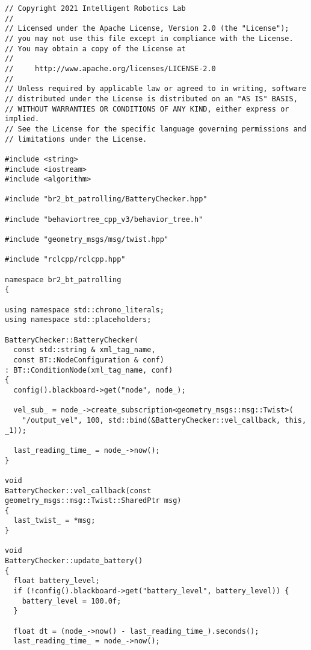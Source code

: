  \footnotesize
\begin{tcolorbox}[sharp corners, colframe=gray!80, colback=LightGray, left=0pt, top=0pt, bottom=0pt, title=\texttt{br2\_bt\_patrolling/src/br2\_bt\_patrolling/BatteryChecker.cpp}]
  \begin{verbatim}
// Copyright 2021 Intelligent Robotics Lab
//
// Licensed under the Apache License, Version 2.0 (the "License");
// you may not use this file except in compliance with the License.
// You may obtain a copy of the License at
//
//     http://www.apache.org/licenses/LICENSE-2.0
//
// Unless required by applicable law or agreed to in writing, software
// distributed under the License is distributed on an "AS IS" BASIS,
// WITHOUT WARRANTIES OR CONDITIONS OF ANY KIND, either express or implied.
// See the License for the specific language governing permissions and
// limitations under the License.

#include <string>
#include <iostream>
#include <algorithm>

#include "br2_bt_patrolling/BatteryChecker.hpp"

#include "behaviortree_cpp_v3/behavior_tree.h"

#include "geometry_msgs/msg/twist.hpp"

#include "rclcpp/rclcpp.hpp"

namespace br2_bt_patrolling
{

using namespace std::chrono_literals;
using namespace std::placeholders;

BatteryChecker::BatteryChecker(
  const std::string & xml_tag_name,
  const BT::NodeConfiguration & conf)
: BT::ConditionNode(xml_tag_name, conf)
{
  config().blackboard->get("node", node_);

  vel_sub_ = node_->create_subscription<geometry_msgs::msg::Twist>(
    "/output_vel", 100, std::bind(&BatteryChecker::vel_callback, this, _1));

  last_reading_time_ = node_->now();
}

void
BatteryChecker::vel_callback(const geometry_msgs::msg::Twist::SharedPtr msg)
{
  last_twist_ = *msg;
}

void
BatteryChecker::update_battery()
{
  float battery_level;
  if (!config().blackboard->get("battery_level", battery_level)) {
    battery_level = 100.0f;
  }

  float dt = (node_->now() - last_reading_time_).seconds();
  last_reading_time_ = node_->now();


\end{verbatim}
\end{tcolorbox}
